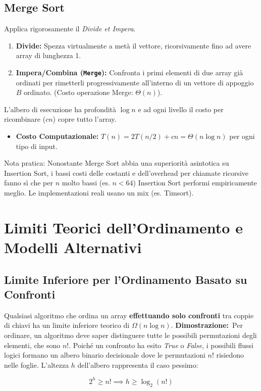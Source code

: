 \documentclass[12pt, a4paper]{article}
\begin{document}
\subsection{Merge Sort}
Applica rigorosamente il \textit{Divide et Impera}.
\begin{enumerate}
\item \textbf{Divide:} Spezza virtualmente a metà il vettore, ricorsivamente fino ad avere array di lunghezza 1.
\item \textbf{Impera/Combina (\texttt{Merge}):} Confronta i primi elementi di due array già ordinati per rimetterli progressivamente all'interno di un vettore di appoggio $B$ ordinato. (Costo operazione Merge: $\Theta(n)$).
\end{enumerate}
L'albero di esecuzione ha profondità $\log n$ e ad ogni livello il costo per ricombinare ($cn$) copre tutto l'array.
\begin{itemize}
\item \textbf{Costo Computazionale:} $T(n) = 2T(n/2) + cn = \Theta(n \log n)$ per ogni tipo di input.
\end{itemize}
Nota pratica: Nonostante Merge Sort abbia una superiorità asintotica su Insertion Sort, i bassi costi delle costanti e dell'overhead per chiamate ricorsive fanno sì che per $n$ molto bassi (es. $n < 64$) Insertion Sort performi empiricamente meglio. Le implementazioni reali usano un mix (es. Timsort).

\newpage

\section{Limiti Teorici dell'Ordinamento e Modelli Alternativi}

\subsection{Limite Inferiore per l'Ordinamento Basato su Confronti}
Qualsiasi algoritmo che ordina un array \textbf{effettuando solo confronti} tra coppie di chiavi ha un limite inferiore teorico di \textbf{$\Omega(n \log n)$}.
\textbf{Dimostrazione:}\
Per ordinare, un algoritmo deve saper distinguere tutte le possibili permutazioni degli elementi, che sono $n!$. Poiché un confronto ha esito \textit{True} o \textit{False}, i possibili flussi logici formano un albero binario decisionale dove le permutazioni $n!$ risiedono nelle foglie. L'altezza $h$ dell'albero rappresenta il caso pessimo:


$$2^h \ge n! \implies h \ge \log_2(n!)$$
\end{document}
